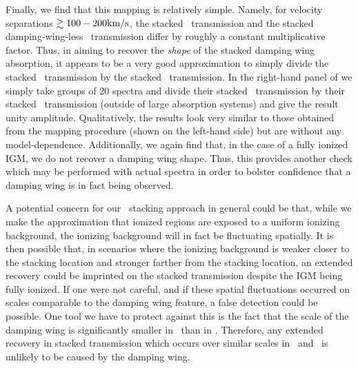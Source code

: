 Finally, we find that this mapping is relatively simple. Namely, for velocity separations $\gtrsim 100-200\text{km}/\text{s}$, the stacked \lyb\ transmission and the stacked damping-wing-less \lya\ transmission differ by roughly a constant multiplicative factor. Thus, in aiming to recover the \textit{shape} of the stacked damping wing absorption, it appears to be a very good approximation to simply divide the stacked \lya\ transmission by the stacked \lyb\ transmission. In the right-hand panel of  we simply take groups of 20 spectra and divide their stacked \lya\ transmission by their stacked \lyb\ transmission (outside of large absorption systems) and give the result unity amplitude. Qualitatively, the results look very similar to those obtained from the mapping procedure (shown on the left-hand side) but are without any model-dependence. Additionally, we again find that, in the case of a fully ionized IGM, we do not recover a damping wing shape. Thus, this provides another check which may be performed with actual spectra in order to bolster confidence that a damping wing is in fact being observed. 


A potential concern for our \lya\ stacking approach in general could be that, while we make the approximation that ionized regions are exposed to a uniform ionizing background, the ionizing background will in fact be fluctuating spatially. It is then possible that, in scenarios where the ionizing background is weaker closer to the stacking location and stronger farther from the stacking location, an extended recovery could be imprinted on the stacked transmission despite the IGM being fully ionized. If one were not careful, and if these spatial fluctuations occurred on scales comparable to the damping wing feature, a false detection could be possible. One tool we have to protect against this is the fact that the scale of the damping wing is significantly smaller in \lyb\ than in \lya. Therefore, any extended recovery in stacked transmission which occurs over similar scales in \lya\ and \lyb\ is unlikely to be caused by the damping wing. 



